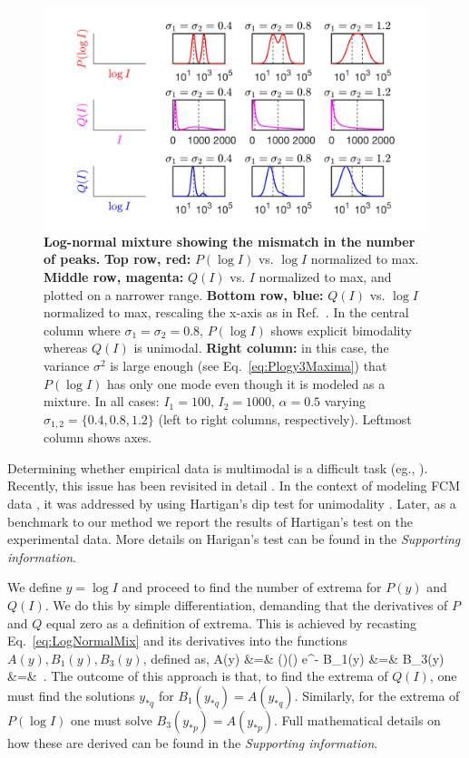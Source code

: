 \documentclass[11pt,a4paper,final]{article}
\begin{document}
\begin{figure}[!ht]
 \centering
  \includegraphics[clip,width=1\hsize]{Fig1.png}
  \caption{\textbf{Log-normal mixture showing the mismatch in the number of peaks.} \textbf{Top row, red:} $P(\log I)$ vs. $\log I$ normalized to max. \textbf{Middle row, magenta:} $Q(I)$ vs. $I$ normalized to max, and plotted on a narrower range. \textbf{Bottom row, blue:} $Q(I)$ vs. $\log I$ normalized to max, rescaling the x-axis as in Ref.~\cite{Novo2008}. In the central column where $\sigma_1=\sigma_2=0.8$, $P(\log I)$ shows explicit bimodality whereas $Q(I)$ is unimodal. \textbf{Right column:} in this case, the variance $\sigma^2$ is large enough (see Eq.~\ref{eq:Plogy3Maxima}) that $P(\log I)$ has only one mode even though it is modeled as a mixture. In all cases: $I_1=100,\,I_2=1000,\,\alpha=0.5$ varying $\sigma_{1,2}=\{0.4,0.8,1.2\}$ (left to right columns, respectively). Leftmost column shows axes. }
  \label{fig:PlotsLinearLog}
\end{figure}

Determining whether empirical data is multimodal is a difficult task (eg., \cite{Silverman1981}). Recently, this issue has been revisited in detail \cite{Johnsson2017}. In the context of modeling FCM data \cite{Das2009}, it was addressed by using Hartigan's dip test for unimodality \cite{Hartigan1985}. Later, as a benchmark to our method we report the results of Hartigan's test on the experimental data. More details on Harigan's test can be found in the \emph{Supporting information}.
\smallskip

We define $y=\log I$ and proceed to find the number of extrema for $P(y)$ and $Q(I)$. We do this by simple differentiation, demanding that the derivatives of $P$ and $Q$ equal zero as a definition of extrema. This is achieved by recasting Eq.~\ref{eq:LogNormalMix} and its derivatives into the functions $A(y),B_1(y),B_3(y)$, defined as,
\bea 
\label{eq:extrema}
A(y) &=& \left(\right)\left(\right) e^{-}  \nn
B_1(y) &=&  \nn
B_3(y) &=& \,.
\eea
The outcome of this approach is that, to find the extrema of $Q(I)$, one must find the solutions $y_{*q}$ for $B_1(y_{*q})=A(y_{*q})$. Similarly, for the extrema of $P(\log I)$ one must solve $B_3(y_{*p})=A(y_{*p})$. Full mathematical details on how these are derived can be found in the \emph{Supporting information}. 
\end{document}

